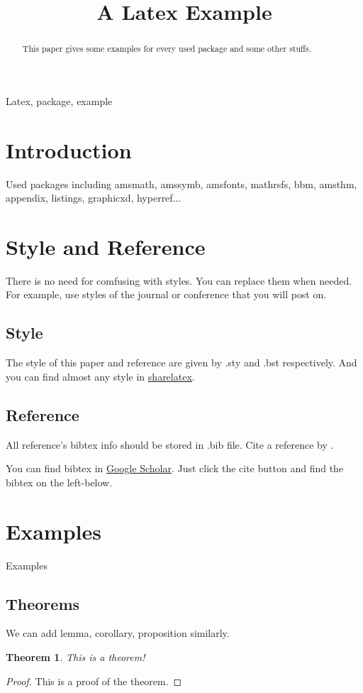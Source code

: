 \documentclass{article}
\title{A Latex Example}
\newtheorem{theorem}{Theorem}
\begin{document}
    \maketitle %

    \begin{abstract}
        This paper gives some examples for every used package and some other stuffs.
    \end{abstract}

    \begin{keywords}
        Latex, package, example
    \end{keywords}

    \section{Introduction}
    Used packages including amsmath, amssymb, amsfonts, mathrsfs, bbm, amsthm, appendix, listings, graphicxd, hyperref...

    \section{Style and Reference}
    There is no need for comfusing with styles. 
    You can replace them when needed. 
    For example, use styles of the journal or conference that you will post on.
    
    \subsection{Style}
    The style of this paper and reference are given by .sty and .bst respectively.
    And you can find almost any style in \href{https://www.sharelatex.com/templates}{sharelatex}.
    
    \subsection{Reference}
    All reference's bibtex info should be stored in .bib file.
    Cite a reference by \cite{referencekey}.

    You can find bibtex in \href{https://scholar.google.com}{Google Scholar}. Just click the cite button and find the bibtex on the left-below.

    \section{Examples}
    Examples

    \subsection{Theorems}
    We can add lemma, corollary, proposition similarly.
    \begin{theorem}
        This is a theorem!
        \label{theorem_1}
    \end{theorem}
    \begin{proof}
        This is a proof of the theorem.
    \end{proof}
\end{document}
